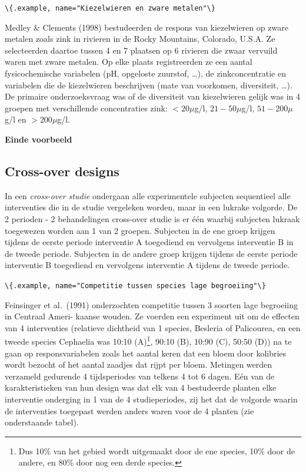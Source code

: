 \documentclass[
  12pt,dutch,coursenotes]{book}
\newcommand{\passthrough}[1]{#1}
\begin{document}
\passthrough{\lstinline!\{.example, name="Kiezelwieren en zware metalen"\}!}

Medley \& Clements (1998) bestudeerden de respons van kiezelwieren
op zware metalen zoals zink in rivieren in de Rocky Mountains, Colorado, U.S.A.
Ze selecteerden daartoe tussen 4 en 7 plaatsen op 6 rivieren die zwaar vervuild
waren met zware metalen. Op elke plaats registreerden ze een aantal fysicochemische
variabelen (pH, opgeloste zuurstof, \ldots), de zinkconcentratie en variabelen die de
kiezelwieren beschrijven (mate van voorkomen, diversiteit, \ldots).
De primaire onderzoeksvraag was of de diversiteit van kiezelwieren gelijk was in
4 groepen met verschillende concentraties zink:
\(<20 \mu\)g/l, \(21-50 \mu\)g/l, \(51-200 \mu\)g/l en \(>200 \mu\)g/l.

\textbf{Einde voorbeeld}

\hypertarget{cross-over-designs}{%
\subsection{Cross-over designs}\label{cross-over-designs}}

In een \emph{cross-over studie} ondergaan alle experimentele subjecten sequentieel alle
interventies die in de studie vergeleken worden, maar in een lukrake
volgorde. De 2 perioden - 2 behandelingen cross-over studie is er één
waarbij subjecten lukraak toegewezen worden aan 1 van 2 groepen.
Subjecten in de ene groep krijgen tijdens de eerste periode interventie A
toegediend en vervolgens interventie B in de tweede periode. Subjecten in
de andere groep krijgen tijdens de eerste periode interventie B toegediend
en vervolgens interventie A tijdens de tweede periode.

\passthrough{\lstinline!\{.example, name="Competitie tussen species lage begroeiing"\}!}

Feinsinger et al.~(1991) onderzochten competitie tussen 3 soorten lage begroeiing in Centraal Ameri- kaanse wouden. Ze voerden een experiment uit om de effecten van 4 interventies (relatieve dichtheid van 1 species, Besleria of Palicourea, en een tweede species Cephaelia was 10:10 (A)\footnote{Dus 10\% van het gebied wordt uitgemaakt door de ene species, 10\% door de andere, en 80\% door nog een derde species.}, 90:10 (B), 10:90 (C), 50:50 (D)) na te gaan op responsvariabelen zoals het aantal keren dat een bloem door kolibries wordt bezocht of het aantal zaadjes dat rijpt per bloem. Metingen werden verzameld gedurende 4 tijdsperiodes van telkens 4 tot 6 dagen. Eén van de karakteristieken van hun design was dat elk van 4 bestudeerde planten elke interventie onderging in 1 van de 4 studieperiodes, zij het dat de volgorde waarin de interventies toegepast werden anders waren voor de 4 planten (zie onderstaande tabel).
\end{document}
